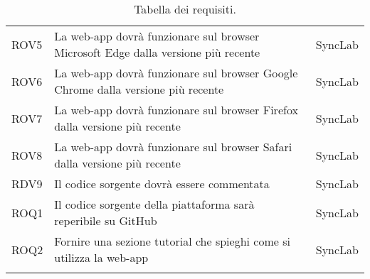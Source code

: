 \begin{center}
\begin{longtable}{ |p{1.5cm}|p{9cm}|p{1.5cm}|  }
        ROV5&La web-app dovrà funzionare sul browser Microsoft Edge dalla versione più recente&SyncLab\\
        ROV6&La web-app dovrà funzionare sul browser Google Chrome dalla versione più recente&SyncLab\\
        ROV7&La web-app dovrà funzionare sul browser Firefox dalla versione più recente&SyncLab\\
        ROV8&La web-app dovrà funzionare sul browser Safari dalla versione più recente&SyncLab\\
        RDV9&Il codice sorgente dovrà essere commentata&SyncLab\\
        ROQ1&Il codice sorgente della piattaforma sarà reperibile su GitHub&SyncLab\\
        ROQ2&Fornire una sezione tutorial che spieghi come si utilizza la web-app&SyncLab\\
\hline
\caption{\label{tab:tabella dei requisiti}Tabella dei requisiti.}
\end{longtable}
\end{center}